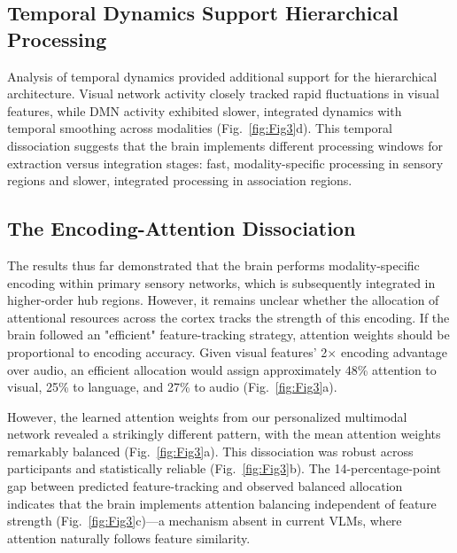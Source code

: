 \documentclass[10pt,letterpaper]{article}
\begin{document}
\subsection{Temporal Dynamics Support Hierarchical Processing}

Analysis of temporal dynamics provided additional support for the hierarchical architecture. Visual network activity closely tracked rapid fluctuations in visual features, while DMN activity exhibited slower, integrated dynamics with temporal smoothing across modalities (Fig.~\ref{fig:Fig3}d). This temporal dissociation suggests that the brain implements different processing windows for extraction versus integration stages: fast, modality-specific processing in sensory regions and slower, integrated processing in association regions.


\subsection{The Encoding-Attention Dissociation}

The results thus far demonstrated that the brain performs modality-specific encoding within primary sensory networks, which is subsequently integrated in higher-order hub regions. However, it remains unclear whether the allocation of attentional resources across the cortex tracks the strength of this encoding. If the brain followed an "efficient" feature-tracking strategy, attention weights should be proportional to encoding accuracy. Given visual features' 2$\times$ encoding advantage over audio, an efficient allocation would assign approximately 48\% attention to visual, 25\% to language, and 27\% to audio (Fig.~\ref{fig:Fig3}a).

However, the learned attention weights from our personalized multimodal network revealed a strikingly different pattern, with the mean attention weights remarkably balanced (Fig.~\ref{fig:Fig3}a). This dissociation was robust across participants and statistically reliable (Fig.~\ref{fig:Fig3}b). The 14-percentage-point gap between predicted feature-tracking and observed balanced allocation indicates that the brain implements attention balancing independent of feature strength (Fig.~\ref{fig:Fig3}c)---a mechanism absent in current VLMs, where attention naturally follows feature similarity.
\end{document}
